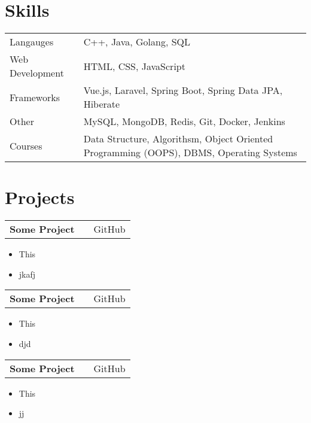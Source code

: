 \documentclass[a4paper,10pt]{article}
\makeatletter
\newenvironment{joblong}[2]
    {
    \begin{tabularx}{\linewidth}{@{}l X r@{}}
    \textbf{#1} & \hfill &  #2 \\[3.75pt]
    \end{tabularx}
    \begin{minipage}[t]{\linewidth}
    \begin{itemize}[nosep,after=\strut, leftmargin=1em, itemsep=2pt,label=--]
    }
    {
    \end{itemize}
    \end{minipage}    
    }
\makeatother
\begin{document}
\vspace{-4pt}

\section{Skills}
\vspace{-5pt}
\begin{tabularx}{\linewidth}{@{}l X@{}}
Langauges &  \normalsize{C++, Java, Golang, SQL}\\
Web Development & \normalsize{HTML, CSS, JavaScript}\\
Frameworks &  \normalsize{Vue.js, Laravel, Spring Boot, Spring Data JPA, Hiberate}\\
Other & \normalsize{MySQL, MongoDB, Redis, Git, Docker, Jenkins}\\
Courses & Data Structure, Algorithsm, Object Oriented Programming (OOPS), DBMS, Operating Systems
\end{tabularx}


  
\section{Projects}
\vspace{-5pt}
\begin{joblong}{Some Project}{GitHub}
    \item This
    \item jkafj
\end{joblong}

\begin{joblong}{Some Project}{GitHub}
    \item This
    \item djd
\end{joblong}

\begin{joblong}{Some Project}{GitHub}
    \item This
    \item jj
\end{joblong}

\end{document}
